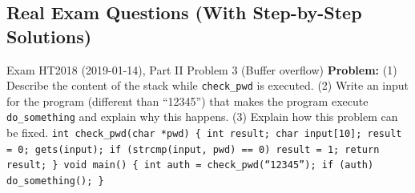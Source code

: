 \documentclass[12pt, a4paper]{article}
\begin{document}
\subsection*{Real Exam Questions (With Step-by-Step Solutions)}

\begin{practicebox}{Exam HT2018 (2019-01-14), Part II Problem 3 (Buffer overflow)}
\textbf{Problem:} (1) Describe the content of the stack while \texttt{check\_pwd} is executed. (2) Write an input for the program (different than ``12345'') that makes the program execute \texttt{do\_something} and explain why this happens. (3) Explain how this problem can be fixed. \texttt{int check\_pwd(char *pwd) \{ int result; char input[10]; result = 0; gets(input); if (strcmp(input, pwd) == 0) result = 1; return result; \} void main() \{ int auth = check\_pwd(``12345''); if (auth) do\_something(); \}}


\end{practicebox}
\end{document}
